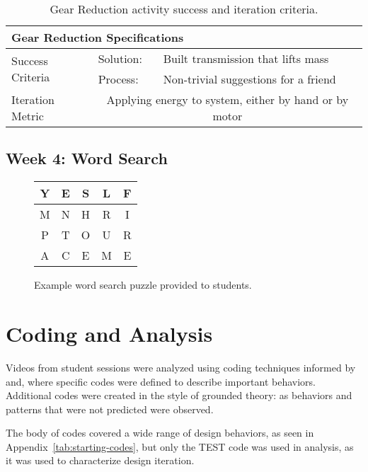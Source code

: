 	\begin{table}
	\begin{centering}
	\begin{tabular}{l  l   l}
		\multicolumn{3}{l}{{\large Gear Reduction Specifications}} \\
		\toprule
		\multirow{2}{*}{Success Criteria}  
			& Solution: 		& Built transmission that lifts mass \\ \cmidrule(r){2-3}
			& Process:		& Non-trivial suggestions for a friend \\ \midrule
		Iteration Metric	 & \multicolumn{2}{c}{Applying energy to system, either by hand or by motor}\\ 
		\bottomrule
	\end{tabular}
	\caption{Gear Reduction activity success and iteration criteria.}
	\label{tab:spec-gears}
	\end{centering}
	\end{table}

\subsection{Week 4: Word Search}
	
	\begin{figure}
	\begin{centering}
	\begin{tabular}{|c|c|c|c|c|}
	\hline 
	Y & E & S & L & F\tabularnewline
	\hline
	\hline 
	M & N & H & R & I\tabularnewline
	\hline
	\hline 
	P & T & O & U & R\tabularnewline
	\hline
	\hline 
	A & C & E & M & E\tabularnewline
	\hline
	\end{tabular}
	\par\end{centering}
	
	\caption{Example word search puzzle provided to students.}
	\label{fig:Example-word-search}
	\end{figure}
	


\section{Coding and Analysis} \label{sec:analysis-plan}
Videos from student sessions were analyzed using coding techniques informed by and, where specific codes were defined to describe important behaviors. Additional codes were created in the style of grounded theory: as behaviors and patterns that were not predicted were observed. 

The body of codes covered a wide range of design behaviors, as seen in Appendix~\ref{tab:starting-codes}, but only the TEST code was used in analysis, as it was used to characterize design iteration. 
